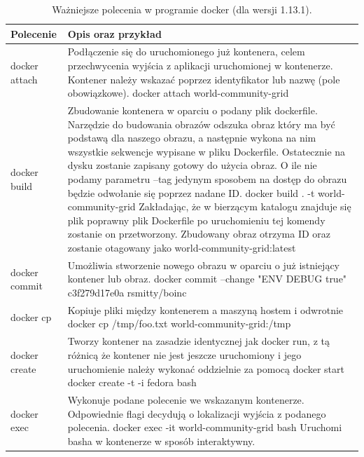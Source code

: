 \documentclass[10pt,a4paper,titlepage,twoside]{report}
\begin{document}
\begin{table}[!htbp]
\caption{Ważniejsze polecenia w programie docker (dla wersji 1.13.1). \cite{ad27}}
\label{docker_cli}
\begin{tabular}{|p{3cm}|p{11cm}|}
  \hline
  \textbf{Polecenie} & \textbf{Opis oraz przykład}\\
  \hline
  docker attach & Podłączenie się do uruchomionego już kontenera, celem przechwycenia wyjścia z aplikacji uruchomionej w kontenerze. Kontener należy wskazać poprzez identyfikator lub nazwę (pole obowiązkowe). \newline docker attach world-community-grid \\
  \hline
  docker build & Zbudowanie kontenera w oparciu o podany plik dockerfile. Narzędzie do budowania obrazów odszuka obraz który ma być podstawą dla naszego obrazu, a następnie wykona na nim wszystkie sekwencje wypisane w pliku Dockerfile. Ostatecznie na dysku zostanie zapisany gotowy do użycia obraz. O ile nie podamy parametru –tag jedynym sposobem na dostęp do obrazu będzie odwołanie się poprzez nadane ID.
  \newline docker build . -t  world-community-grid \newline Zakładając, że w bierzącym katalogu znajduje się plik poprawny plik Dockerfile po uruchomieniu tej komendy zostanie on przetworzony. Zbudowany obraz otrzyma ID oraz zostanie otagowany jako  world-community-grid:latest \\
  \hline
  docker commit & Umożliwia stworzenie nowego obrazu w oparciu o już istniejący kontener lub obraz. \newline docker commit --change "ENV DEBUG true" c3f279d17e0a rsmitty/boinc \\
  \hline
  docker cp & Kopiuje pliki między kontenerem a maszyną hostem i odwrotnie \newline docker cp /tmp/foo.txt world-community-grid:/tmp \\
  \hline
  docker create & Tworzy kontener na zasadzie identycznej jak docker run, z tą różnicą że kontener nie jest jeszcze uruchomiony i jego uruchomienie należy wykonać oddzielnie za pomocą docker start \newline docker create -t -i fedora bash \\
  \hline
  docker exec & Wykonuje podane polecenie we wskazanym kontenerze. Odpowiednie flagi decydują o lokalizacji wyjścia z podanego polecenia. \newline docker exec -it  world-community-grid bash \newline Uruchomi basha w kontenerze w sposób interaktywny. \\

\end{tabular}
\end{table}
\end{document}
